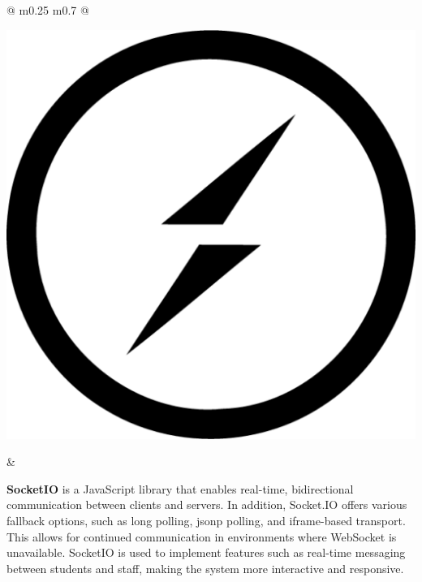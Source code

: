 	\vspace*{0.5cm}
	\newpage
	\begin{tabular}{ @{} m{0.25\textwidth} m{0.7\textwidth} @{} }
		\begin{minipage}{\linewidth}
			\centering
			\includegraphics[width=0.45\linewidth]{graphics/socket-io.512x512.png}
			\label{fig:socketio}
		\end{minipage}
		&
		\begin{minipage}{\linewidth}
			\textbf{SocketIO} is a JavaScript library that enables real-time, bidirectional communication between clients and servers. \cite{socketio} In addition, Socket.IO offers various fallback options, such as long polling, \acs{jsonp} polling, and iframe-based transport. This allows for continued communication in environments where WebSocket is unavailable. \cite{socketio-vs-websocket} SocketIO is used to implement features such as real-time messaging between students and staff, making the system more interactive and responsive. 
		\end{minipage}
	\end{tabular}
	
	
